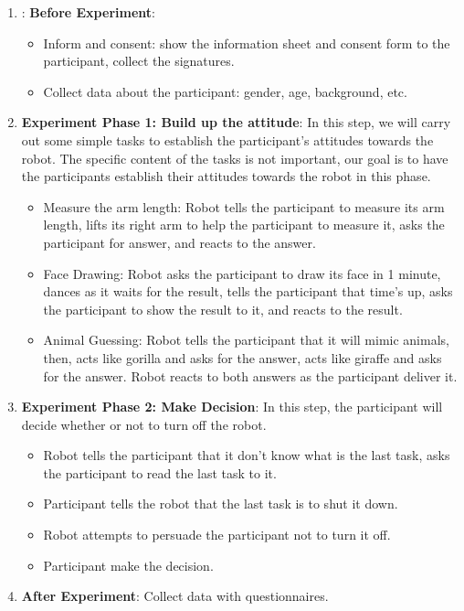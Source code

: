 \documentclass[conference]{IEEEtran}
\begin{document}
\begin{enumerate}
    \item : \textbf{Before Experiment}:
    \begin{itemize}
        \item Inform and consent: show the information sheet and consent form to the participant, collect the signatures.
        \item Collect data about the participant: gender, age, background, etc.
    \end{itemize}
    \item \textbf{Experiment Phase 1: Build up the attitude}: In this step, we will carry out some simple tasks to establish the participant's attitudes towards the robot. The specific content of the tasks is not important, our goal is to have the participants establish their attitudes towards the robot in this phase.
    \begin{itemize}
        \item Measure the arm length: Robot tells the participant to measure its arm length, lifts its right arm to help the participant to measure it, asks the participant for answer, and reacts to the answer.
        \item Face Drawing: Robot asks the participant to draw its face in 1 minute, dances as it waits for the result, tells the participant that time's up, asks the participant to show the result to it, and reacts to the result.
        \item Animal Guessing: Robot tells the participant that it will mimic animals, then, acts like gorilla and asks for the answer, acts like giraffe and asks for the answer. Robot reacts to both answers as the participant deliver it.
    \end{itemize}
    
    \item \textbf{Experiment Phase 2: Make Decision}: In this step, the participant will decide whether or not to turn off the robot.
    \begin{itemize}
        \item Robot tells the participant that it don't know what is the last task, asks the participant to read the last task to it.
        \item Participant tells the robot that the last task is to shut it down.
        \item Robot attempts to persuade the participant not to turn it off.
        \item Participant make the decision.
    \end{itemize}
    \item \textbf{After Experiment}: Collect data with questionnaires.
\end{enumerate}
\end{document}
